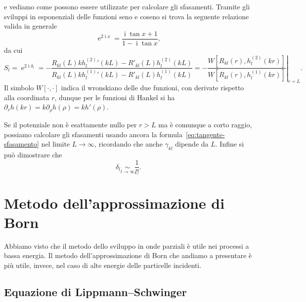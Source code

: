 \documentclass[a4paper,fleqn,twoside,12pt]{article}
\DeclareMathOperator{\e}{\mathrm{e}} %
\DeclareMathOperator{\uimm}{\mathrm{i}} %
\begin{document}
e vediamo come possono essere utilizzate per calcolare gli sfasamenti.  Tramite
gli sviluppi in esponenziali delle funzioni seno e coseno si trova la seguente
relazione valida in generale
\begin{equation}
  \e^{2\uimm x} = \frac{\uimm \tan x + 1}{1 - \uimm \tan x},
\end{equation}
da cui
\begin{equation}
  S_{l} = \e^{2\uimm\delta_{l}} = -\frac{R_{kl}(L)k h_{l}^{(2)}{}'(kL) -
    R'_{kl}(L)h_{l}^{(2)}(kL)}{R_{kl}(L)k h_{l}^{(1)}{}'(kL) -
    R'_{kl}(L)h_{l}^{(1)}(kL)} = -\left.\frac{W[R_{kl}(r),
      h_{l}^{(2)}(kr)]}{W[R_{kl}(r), h_{l}^{(1)}(kr)]}\right|_{r = L}.
\end{equation}
Il simbolo $W[\cdot,\cdot]$ indica il wronskiano delle due funzioni, con
derivate rispetto alla coordinata $r$, dunque per le funzioni di Hankel si ha
$\partial_{r}h(kr) = k \partial_{\rho}h(\rho) = k h'(\rho)$.

Se il potenziale non è esattamente nullo per $r > L$ ma è comunque a corto
raggio, possiamo calcolare gli sfasamenti usando ancora la
formula~\eqref{eq:tangente-sfasamento} nel limite $L \to \infty$, ricordando che
anche $\gamma_{kl}$ dipende da $L$.  Infine si può dimostrare che
\begin{equation}
  \delta_{l} \underset{l \to \infty}{\sim} \frac{1}{l!}.
\end{equation}

\section{Metodo dell'approssimazione di Born}
\label{sec:metodo-born}

Abbiamo visto che il metodo dello sviluppo in onde parziali è utile nei processi
a bassa energia.  Il metodo dell'approssimazione di Born che andiamo a
presentare è più utile, invece, nel caso di alte energie delle particelle
incidenti.

\subsection{Equazione di Lippmann–Schwinger}
\label{sec:equazione-ls}
\end{document}
